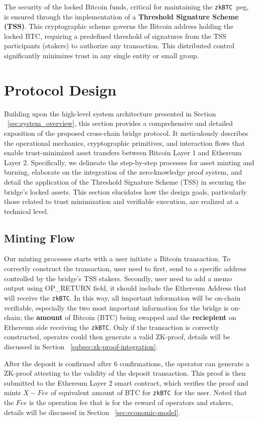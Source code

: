 \documentclass{DESSThesis}
\newcommand{\zktoken}{\texttt{zkBTC}}
\begin{document}
The security of the locked Bitcoin funds, critical for maintaining the \zktoken\ peg, is ensured through the implementation of a \textbf{Threshold Signature Scheme (TSS)}. This cryptographic scheme governs the Bitcoin address holding the locked BTC, requiring a predefined threshold of signatures from the TSS participants (stakers) to authorize any transaction. This distributed control significantly minimizes trust in any single entity or small group.


\section{Protocol Design} \label{sec:protocol-design}
Building upon the high-level system architecture presented in Section ~\ref{sec:system_overview}, this section provides a comprehensive and detailed exposition of the proposed cross-chain bridge protocol. It meticulously describes the operational mechanics, cryptographic primitives, and interaction flows that enable trust-minimized asset transfers between Bitcoin Layer 1 and Ethereum Layer 2. Specifically, we delineate the step-by-step processes for asset minting and burning, elaborate on the integration of the zero-knowledge proof system, and detail the application of the Threshold Signature Scheme (TSS) in securing the bridge's locked assets. This section elucidates how the design goals, particularly those related to trust minimization and verifiable execution, are realized at a technical level.
\subsection{Minting Flow} \label{subsec:minting-flow}
Our minting processes starts with a user initiate a Bitcoin transaction. To correctly construct the transaction, user need to first, send to a specific address controlled by the bridge's TSS stakers. Secondly, user need to add a memo output using OP\_RETURN field, it should include the Ethereum Address that will receive the \zktoken. In this way, all important information will be on-chain verifiable, especially the two most important information for the bridge is on-chain; the \textbf{amount} of Bitcoin (BTC) being swapped and the \textbf{reciepient} on Ethereum side receiving the \zktoken. Only if the transaction is correctly constructed, operatrs could then generate a valid ZK-proof, details will be discussed in Section ~\ref{subsec:zk-proof-integration}.

After the deposit is confirmed after 6 confirmations, the operator can generate a ZK-proof attesting to the validity of the deposit transaction. This proof is then submitted to the Ethereum Layer 2 smart contract, which verifies the proof and mints $X-Fee$ of equivalent amount of BTC for \zktoken\ for the user. Noted that the $Fee$ is the operation fee that is for the reward of operators and stakers, details will be discussed in Section ~\ref{sec:economic-model}. 
\end{document}
